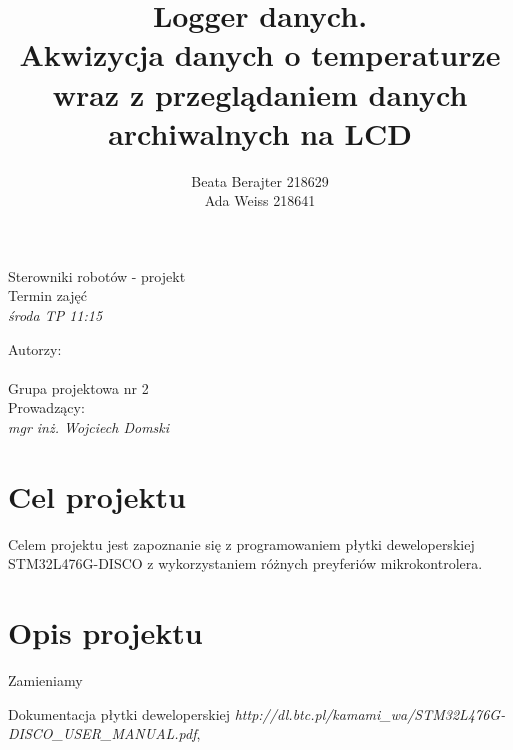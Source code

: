 \documentclass[a4paper,12pt]{article}
\author{Beata Berajter 218629\\
Ada Weiss 218641 }%
\title{Logger danych.\\Akwizycja danych o temperaturze wraz z przeglądaniem danych archiwalnych na LCD }
\makeatletter
\renewcommand{\maketitle}{\begin{titlepage}  
    \vspace*{1cm}
    \begin{center}
  Sterowniki robotów - projekt\\
Termin zajęć\\
\textit{środa TP 11:15}
    \end{center}
      \vspace{3cm}
    \begin{center}
     \LARGE \textsc {\@title}
         \end{center}
     \vspace{1cm}
    
    \begin{center}
    Autorzy:\\
   \textit{\@author} \\
\vspace{1cm}
Grupa projektowa nr 2\\
\vspace{2cm}
Prowadzący:\\
 \textit{mgr inż. Wojciech Domski}

     \end{center}
      \vspace{1cm}
    
    
    \vspace*{\stretch{6}}
    \begin{center}
    \@date
    \end{center}
  \end{titlepage}
}
\makeatother
\begin{document}
\newpage
\maketitle
\newpage
\tableofcontents

\newpage
\section{Cel projektu}
Celem projektu jest zapoznanie się z programowaniem płytki deweloperskiej STM32L476G-DISCO z wykorzystaniem różnych preyferiów mikrokontrolera.
\section{Opis projektu}
Zamieniamy




\begin{thebibliography}{99}
 Dokumentacja płytki deweloperskiej
\emph{http://dl.btc.pl/kamami_wa/STM32L476G-DISCO_USER_MANUAL.pdf}, 

\end{thebibliography}
\end{document}
